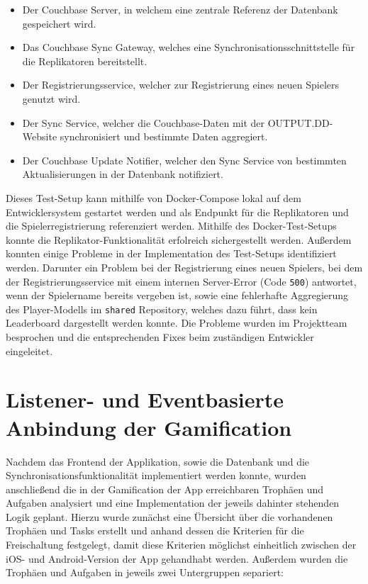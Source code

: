 \begin{itemize}
\item Der Couchbase Server, in welchem eine zentrale Referenz der Datenbank gespeichert wird.
\item Das Couchbase Sync Gateway, welches eine Synchronisationsschnittstelle für die Replikatoren bereitstellt.
\item Der Registrierungsservice, welcher zur Registrierung eines neuen Spielers genutzt wird.
\item Der Sync Service, welcher die Couchbase-Daten mit der OUTPUT.DD-Website synchronisiert und bestimmte Daten aggregiert.
\item Der Couchbase Update Notifier, welcher den Sync Service von bestimmten Aktualisierungen in der Datenbank notifiziert.
\end{itemize}

\noindent Dieses Test-Setup kann mithilfe von Docker-Compose lokal auf dem Entwicklersystem gestartet werden und als Endpunkt für die Replikatoren und die Spielerregistrierung referenziert werden. Mithilfe des Docker-Test-Setups konnte die Replikator-Funktionalität erfolreich sichergestellt werden. Außerdem konnten einige Probleme in der Implementation des Test-Setups identifiziert werden. Darunter ein Problem bei der Registrierung eines neuen Spielers, bei dem der Registrierungsservice mit einem internen Server-Error (Code \texttt{500}) antwortet, wenn der Spielername bereits vergeben ist, sowie eine fehlerhafte Aggregierung des Player-Modells im \texttt{shared} Repository, welches dazu führt, dass kein Leaderboard dargestellt werden konnte. Die Probleme wurden im Projektteam besprochen und die entsprechenden Fixes beim zuständigen Entwickler eingeleitet.

\section{Listener- und Eventbasierte Anbindung der Gamification}

Nachdem das Frontend der Applikation, sowie die Datenbank und die Synchronisationsfunktionalität implementiert werden konnte, wurden anschließend die in der Gamification der App erreichbaren Trophäen und Aufgaben analysiert und eine Implementation der jeweils dahinter stehenden Logik geplant. Hierzu wurde zunächst eine Übersicht über die vorhandenen Trophäen und Tasks erstellt und anhand dessen die Kriterien für die Freischaltung festgelegt, damit diese Kriterien möglichst einheitlich zwischen der iOS- und Android-Version der App gehandhabt werden. Außerdem wurden die Trophäen und Aufgaben in jeweils zwei Untergruppen separiert:

